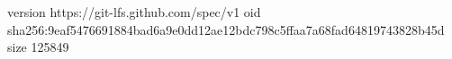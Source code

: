 version https://git-lfs.github.com/spec/v1
oid sha256:9eaf5476691884bad6a9e0dd12ae12bdc798c5ffaa7a68fad64819743828b45d
size 125849
